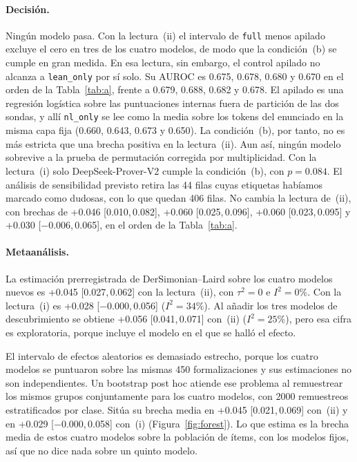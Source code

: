 \documentclass[10pt]{article}
\newcommand{\vr}[1]{\texttt{#1}}
\newcommand{\ic}[2]{[#1,\,#2]}
\begin{document}
\paragraph{Decisión.}
Ningún modelo pasa. Con la lectura~(ii) el intervalo de \vr{full} menos apilado excluye el cero en tres de los cuatro
modelos, de modo que la condición~(b) se cumple en gran medida.
En esa lectura, sin embargo, el control apilado no alcanza a \vr{lean\_only} por sí solo. Su AUROC es 0.675, 0.678,
0.680 y 0.670 en el orden de la Tabla~\ref{tab:a}, frente a 0.679, 0.688, 0.682 y 0.678. El apilado es una regresión
logística sobre las puntuaciones internas fuera de partición de las dos sondas, y allí \vr{nl\_only} se lee como la media
sobre los tokens del enunciado en la misma capa fija (0.660, 0.643, 0.673 y 0.650). La condición~(b), por tanto, no es
más estricta que una brecha positiva en la lectura~(ii). Aun así, ningún modelo sobrevive a la prueba de
permutación corregida por multiplicidad. Con la lectura~(i) solo DeepSeek-Prover-V2 cumple la condición~(b), con
$p = 0.084$. El análisis de sensibilidad previsto retira las 44 filas cuyas etiquetas habíamos marcado como
dudosas, con lo que quedan 406 filas. No cambia la lectura de~(ii), con brechas de +0.046 \ic{0.010}{0.082}, +0.060 \ic{0.025}{0.096}, +0.060 \ic{0.023}{0.095} y +0.030
\ic{−0.006}{0.065}, en el orden de la Tabla~\ref{tab:a}.

\paragraph{Metaanálisis.}
La estimación prerregistrada de DerSimonian--Laird \citep{dl} sobre los cuatro modelos nuevos es +0.045 \ic{0.027}{0.062} con
la lectura~(ii), con $\tau^2 = 0$ e $I^2 = 0\%$. Con la lectura~(i) es +0.028 \ic{−0.000}{0.056} ($I^2 = 34\%$).
Al añadir los tres modelos de descubrimiento se obtiene +0.056 \ic{0.041}{0.071} con~(ii) ($I^2 = 25\%$), pero esa
cifra es exploratoria, porque incluye el modelo en el que se halló el efecto.

El intervalo de efectos aleatorios es demasiado estrecho, porque los cuatro modelos se puntuaron sobre las mismas
450 formalizaciones y sus estimaciones no son independientes. Un bootstrap post hoc atiende ese problema al
remuestrear los mismos grupos conjuntamente para los cuatro modelos, con 2000 remuestreos estratificados por
clase. Sitúa su brecha media en +0.045 \ic{0.021}{0.069} con~(ii) y en +0.029 \ic{−0.000}{0.058} con~(i) (Figura~\ref{fig:forest}). Lo que estima es la brecha media de estos cuatro modelos sobre la población de ítems, con los modelos fijos, así que no
dice nada sobre un quinto modelo.
\end{document}
